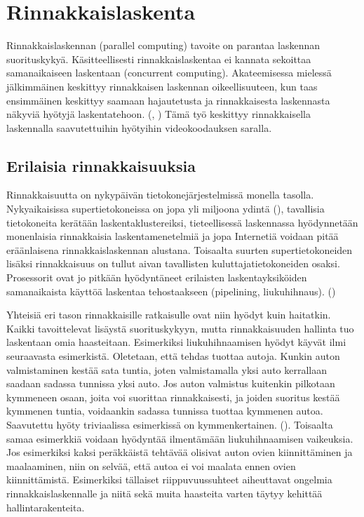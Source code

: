 \newpage

\section{Rinnakkaislaskenta}

Rinnakkaislaskennan (parallel computing) tavoite on parantaa laskennan
suorituskykyä. Käsitteellisesti rinnakkaislaskentaa ei kannata sekoittaa
samanaikaiseen laskentaan (concurrent computing). Akateemisessa mielessä
jälkimmäinen keskittyy rinnakkaisen laskennan oikeellisuuteen, kun taas
ensimmäinen keskittyy saamaan hajautetusta ja rinnakkaisesta laskennasta
näkyviä hyötyjä laskentatehoon. (\cite{intro}, \cite{ari}) Tämä työ keskittyy
rinnakkaisella laskennalla saavutettuihin hyötyihin videokoodauksen saralla.

\subsection{Erilaisia rinnakkaisuuksia}

Rinnakkaisuutta on nykypäivän tietokonejärjestelmissä monella tasolla.
Nykyaikaisissa supertietokoneissa on jopa yli miljoona ydintä (\cite{top500}),
tavallisia tietokoneita kerätään laskentaklustereiksi, tieteellisessä
laskennassa hyödynnetään monenlaisia rinnakkaisia laskentamenetelmiä ja jopa
Internetiä voidaan pitää eräänlaisena rinnakkaislaskennan alustana. Toisaalta
suurten supertietokoneiden lisäksi rinnakkaisuus on tullut aivan tavallisten
kuluttajatietokoneiden osaksi. Prosessorit ovat jo pitkään hyödyntäneet
erilaisten laskentayksiköiden samanaikaista käyttöä laskentaa tehostaakseen
(pipelining, liukuhihnaus). (\cite{intro})

Yhteisiä eri tason rinnakkaisille ratkaisulle ovat niin hyödyt kuin haitatkin.
Kaikki tavoittelevat lisäystä suorituskykyyn, mutta rinnakkaisuuden
hallinta tuo laskentaan omia haasteitaan. Esimerkiksi liukuhihnaamisen hyödyt
käyvät ilmi seuraavasta esimerkistä. Oletetaan, että tehdas tuottaa autoja.
Kunkin auton valmistaminen kestää sata tuntia, joten valmistamalla yksi auto
kerrallaan saadaan sadassa tunnissa yksi auto. Jos auton valmistus kuitenkin
pilkotaan kymmeneen osaan, joita voi suorittaa rinnakkaisesti, ja joiden
suoritus kestää kymmenen tuntia, voidaankin sadassa tunnissa tuottaa kymmenen
autoa. Saavutettu hyöty triviaalissa esimerkissä on kymmenkertainen.
(\cite{intro}). Toisaalta samaa esimerkkiä voidaan hyödyntää ilmentämään
liukuhihnaamisen vaikeuksia. Jos esimerkiksi kaksi peräkkäistä tehtävää
olisivat auton ovien kiinnittäminen ja maalaaminen, niin on selvää, että autoa
ei voi maalata ennen ovien kiinnittämistä. Esimerkiksi tällaiset
riippuvuussuhteet aiheuttavat ongelmia rinnakkaislaskennalle ja niitä sekä
muita haasteita varten täytyy kehittää hallintarakenteita.

